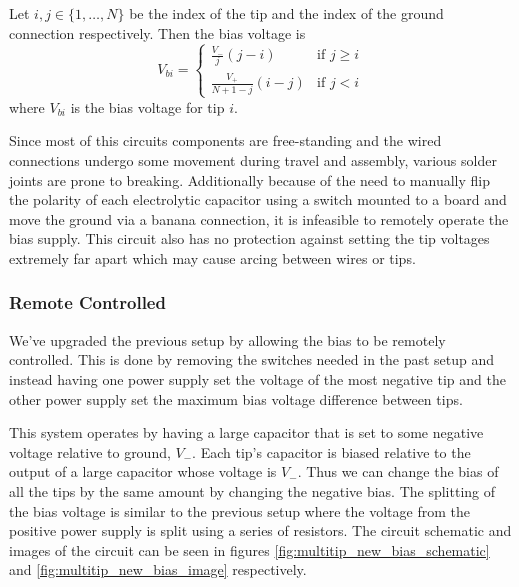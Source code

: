 Let $i, j \in \{1, \dots, N\}$ be the index of the tip and the index of the ground connection respectively. Then the bias voltage is
\begin{equation}
    V_{bi} = \begin{cases}
        \frac{V_-}{j} (j - i) & \text{if } j \geq i \\
        \frac{V_+}{N + 1 - j} (i - j) & \text{if } j < i
    \end{cases}
\end{equation}
where $V_{bi}$ is the bias voltage for tip $i$.


Since most of this circuits components are free-standing and the wired connections undergo some movement during travel and assembly, various solder joints are prone to breaking. Additionally because of the need to manually flip the polarity of each electrolytic capacitor using a switch mounted to a board and move the ground via a banana connection, it is infeasible to remotely operate the bias supply. This circuit also has no protection against setting the tip voltages extremely far apart which may cause arcing between wires or tips.

\subsubsection{Remote Controlled}
\label{ss2:multitip_remote_bias}

We've upgraded the previous setup by allowing the bias to be remotely controlled. This is done by removing the switches needed in the past setup and instead having one power supply set the voltage of the most negative tip and the other power supply set the maximum bias voltage difference between tips.


This system operates by having a large capacitor that is set to some negative voltage relative to ground, $V_-$. Each tip's capacitor is biased relative to the output of a large capacitor whose voltage is $V_-$. Thus we can change the bias of all the tips by the same amount by changing the negative bias. The splitting of the bias voltage is similar to the previous setup where the voltage from the positive power supply is split using a series of resistors. The circuit schematic and images of the circuit can be seen in figures \ref{fig:multitip_new_bias_schematic} and \ref{fig:multitip_new_bias_image} respectively.

